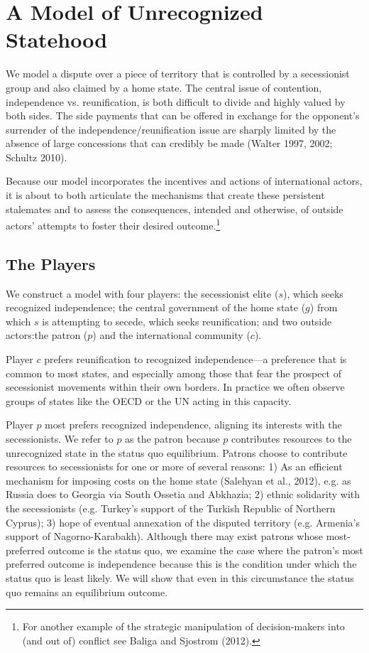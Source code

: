 \section{A Model of Unrecognized Statehood} 
We model a dispute over a piece of territory that is controlled by a secessionist group and also claimed by a home state. The central issue of contention, independence vs. reunification, is both difficult to divide and highly valued by both sides. The side payments that can be offered in exchange for the opponent's surrender of the independence/reunification issue are sharply limited by the absence of large concessions that can credibly be made (Walter 1997, 2002; Schultz 2010).

Because our model incorporates the incentives and actions of international actors, it is about to both articulate the mechanisms that create these persistent stalemates and to assess the consequences, intended and otherwise, of outside actors' attempts to foster their desired outcome.\footnote{For another example of the strategic manipulation of decision-makers into (and out of) conflict see Baliga and Sjostrom (2012).}

\subsection{The Players}

We construct a model with four players: the secessionist elite ($s$), which seeks recognized independence; the central government of the home state ($g$) from which $s$ is attempting to secede, which seeks reunification; and two outside actors:the patron ($p$) and the international community ($c$).

Player $c$ prefers reunification to recognized independence---a preference that is common to most states, and especially among those that fear the prospect of secessionist movements within their own borders. In practice we often observe groups of states like the OECD or the UN acting in this capacity.

Player $p$ most prefers recognized independence, aligning its interests with the secessionists. We refer to $p$ as the patron because $p$ contributes resources to the unrecognized state in the status quo equilibrium. Patrons choose to contribute resources to secessionists for one or more of several reasons: 1) As an efficient mechanism for imposing costs on the home state (Salehyan et al., 2012), e.g. as Russia does to Georgia via South Ossetia and Abkhazia; 2) ethnic solidarity with the secessionists (e.g. Turkey's support of the Turkish Republic of Northern Cyprus); 3) hope of eventual annexation of the disputed territory (e.g. Armenia's support of Nagorno-Karabakh). Although there may exist patrons whose most-preferred outcome is the status quo, we examine the case where the patron's most preferred outcome is independence because this is the condition under which the status quo is least likely. We will show that even in this circumstance the status quo remains an equilibrium outcome.


